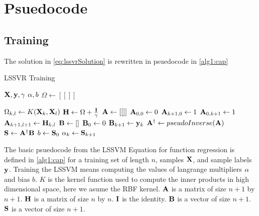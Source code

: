 \documentclass[a4paper,12pt]{scrreprt}
\begin{document}
\chapter{Psuedocode}
\section{Training}
The solution in \cref{eq:lssvrSolution} is rewritten in psuedocode in \cref{alg1:cap}

\begin{algorithm}[H]
        \caption{LSSVR Training}\label{alg1:cap}
        \begin{algorithmic}[1]
                \Require $\vb{X}, \vb{y}, \gamma$
                \Ensure $\vb{\alpha}, b$
                \State $\Omega \gets [[]]$ 

                \State$\Omega_{k,l}\gets K(\vb{X}_k,\vb{X}_l)$
                \EndFor
                \EndFor
                \State $\vb{H} \gets \Omega + \frac{\vb{I}}{\gamma}$
                \State $\vb{A} \gets [[]]$ 
                \State $\vb{A}_{0,0} \gets 0$
                \State $\vb{A}_{k+1,0} \gets 1$
                \State $\vb{A}_{0,k+1} \gets 1$
                \EndFor
                \State $\vb{A}_{k+1,l+1} \gets \vb{H}_{k,l}$
                \EndFor
                \EndFor
                \State $\vb{B}\gets []$ 
                \State $\vb{B}_0 \gets 0$
                \State $\vb{B}_{k+1} \gets \vb{y}_{k}$
                \EndFor
                \State $\vb{A}^{\dagger} \gets pseudoInverse(\vb{A})$ 
                \State $\vb{S} \gets \vb{A}^{\dagger}\vb{B}$
                \State $b \gets \vb{S}_{0}$
                \State $\vb{\alpha}_{k} \gets \vb{S}_{k+1}$
                \EndFor
        \end{algorithmic}
\end{algorithm}

The basic psuedocode from the LSSVM Equation for function regression is defined in \cref{alg1:cap} for a training set of length $n$, samples $\vb{X}$, and sample labels $\vb{y}$. Training the LSSVM means computing the values of langrange multipliers $\vb{\alpha}$ and bias $b$. $K$ is the kernel function used to compute the inner products in high dimensional space, here we asume the RBF kernel. $\vb{A}$ is a matrix of size $n+1$ by $n+1$. $\vb{H}$ is a matrix of size $n$ by $n$. $\vb{I}$ is the identity. $\vb{B}$ is a vector of size $n+1$. $\vb{S}$ is a vector of size $n+1$.
\end{document}
